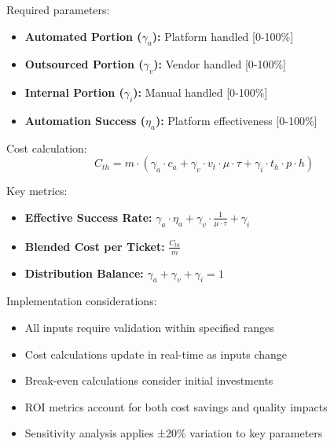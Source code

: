 \documentclass[12pt,a4paper]{article}
\newenvironment{definition}[1]
{\begin{mdframed}[style=definitionstyle,frametitle={Definition: #1}]}
{\end{mdframed}}
\newenvironment{observation}
{\begin{mdframed}[style=observationstyle,frametitle={Observation}]}
{\end{mdframed}}
\begin{document}
\begin{definition}{Ticket Hybrid Solution Inputs}
Required parameters:
\begin{itemize}
    \item \textbf{Automated Portion ($\gamma_a$):} Platform handled [0-100\%]
    \item \textbf{Outsourced Portion ($\gamma_v$):} Vendor handled [0-100\%]
    \item \textbf{Internal Portion ($\gamma_i$):} Manual handled [0-100\%]
    \item \textbf{Automation Success ($\eta_a$):} Platform effectiveness [0-100\%]
\end{itemize}

Cost calculation:
\begin{equation}
    C_{th} = m \cdot (\gamma_a \cdot c_a + \gamma_v \cdot v_t \cdot \mu \cdot \tau + \gamma_i \cdot t_h \cdot p \cdot h)
\end{equation}

Key metrics:
\begin{itemize}
    \item \textbf{Effective Success Rate:} $\gamma_a \cdot \eta_a + \gamma_v \cdot \frac{1}{\mu \cdot \tau} + \gamma_i$
    \item \textbf{Blended Cost per Ticket:} $\frac{C_{th}}{m}$
    \item \textbf{Distribution Balance:} $\gamma_a + \gamma_v + \gamma_i = 1$
\end{itemize}
\end{definition}

\begin{observation}
Implementation considerations:
\begin{itemize}
    \item All inputs require validation within specified ranges
    \item Cost calculations update in real-time as inputs change
    \item Break-even calculations consider initial investments
    \item ROI metrics account for both cost savings and quality impacts
    \item Sensitivity analysis applies ±20\% variation to key parameters
\end{itemize}
\end{observation}
\end{document}
